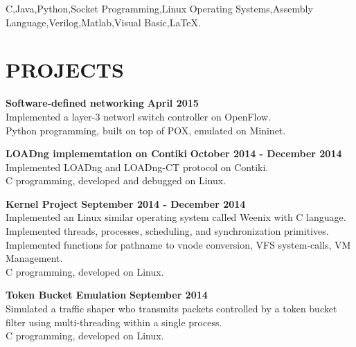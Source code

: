 \documentclass[margin,line]{resume}
\begin{document}
\begin{resume}
    C,\hspace{2mm}Java,\hspace{2mm}Python,\hspace{2mm}Socket Programming,\hspace{2mm}Linux Operating Systems,\hspace{2mm}Assembly Language,\hspace{2mm}Verilog,\hspace{2mm}Matlab,\hspace{2mm}Visual Basic,\hspace{2mm}\LaTeX.

\sectionline

    \section{\mysidestyle \textbf{\large{P}\small{ROJECTS}}}

    \textbf{\listing Software-defined networking} \hfill \textbf{April 2015}\vspace{2mm}\\
    Implemented a layer-3 networl switch controller on OpenFlow.\\
    Python programming, built on top of POX, emulated on Mininet.     

    \textbf{\listing LOADng implememtation on Contiki} \hfill \textbf{October 2014 - December 2014}\vspace{1mm}\\
    Implemented LOADng and LOADng-CT protocol on Contiki.\\
    C programming, developed and debugged on Linux.  

    \textbf{\listing Kernel Project} \hfill \textbf{September 2014 - December 2014}\vspace{2mm}\\
    Implemented an Linux similar operating system called Weenix with C language.\\
	Implemented threads, processes, scheduling, and synchronization primitives.\\
	Implemented functions for pathname to vnode conversion, VFS system-calls, VM Management.\\
	C programming, developed on Linux. 

    \textbf{\listing Token Bucket Emulation} \hfill \textbf{September 2014}\vspace{2mm}\\
    Simulated a traffic shaper who transmits packets controlled by a token bucket filter using multi-threading within a single process.\\
    C programming, developed on Linux.    


\end{resume}
\end{document}

